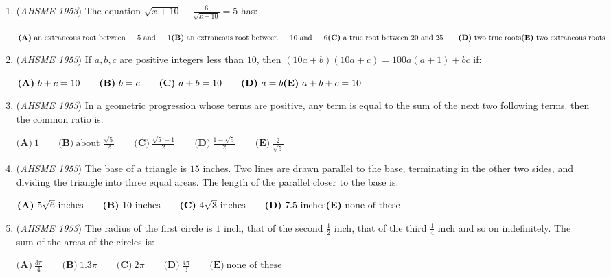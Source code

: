 \begin{enumerate}
	\item (\textit{AHSME 1953}) The equation $\sqrt {x + 10} - \frac {6}{\sqrt {x + 10}} = 5$ has: 


 $\textbf{(A)}\ \text{an extraneous root between } - 5\text{ and } - 1 \\  \textbf{(B)}\ \text{an extraneous root between }-10\text{ and }-6\\ \textbf{(C)}\ \text{a true root between }20\text{ and }25\qquad \textbf{(D)}\ \text{two true roots}\\ \textbf{(E)}\ \text{two extraneous roots}$


	\item (\textit{AHSME 1953}) If $a,b,c$ are positive integers less than $10$, then $(10a + b)(10a + c) = 100a(a + 1) + bc$ if: 


 $\textbf{(A)}\ b + c = 10 \qquad \textbf{(B)}\ b = c \qquad \textbf{(C)}\ a + b = 10 \qquad \textbf{(D)}\ a = b \\  \textbf{(E)}\ a+b+c = 10$


	\item (\textit{AHSME 1953}) In a geometric progression whose terms are positive, any term is equal to the sum of the next two following terms. then the common ratio is: 


 $\textbf{(A)}\ 1 \qquad \textbf{(B)}\ \text{about }\frac{\sqrt{5}}{2} \qquad \textbf{(C)}\ \frac{\sqrt{5}-1}{2}\qquad \textbf{(D)}\ \frac{1-\sqrt{5}}{2}\qquad \textbf{(E)}\ \frac{2}{\sqrt{5}}$


	\item (\textit{AHSME 1953}) The base of a triangle is $15$ inches. Two lines are drawn parallel to the base, terminating in the other two sides, and dividing the triangle into three equal areas. The length of the parallel closer to the base is: 


 $\textbf{(A)}\ 5\sqrt{6}\text{ inches} \qquad \textbf{(B)}\ 10\text{ inches} \qquad \textbf{(C)}\ 4\sqrt{3}\text{ inches}\qquad \textbf{(D)}\ 7.5\text{ inches}\\  \textbf{(E)}\ \text{none of these}$


	\item (\textit{AHSME 1953}) The radius of the first circle is $1$ inch, that of the second $\frac{1}{2}$ inch, that of the third $\frac{1}{4}$ inch and so on indefinitely. 
The sum of the areas of the circles is: 


 $\textbf{(A)}\ \frac{3\pi}{4} \qquad \textbf{(B)}\ 1.3\pi \qquad \textbf{(C)}\ 2\pi \qquad \textbf{(D)}\ \frac{4\pi}{3}\qquad \textbf{(E)}\ \text{none of these}$



\end{enumerate}
